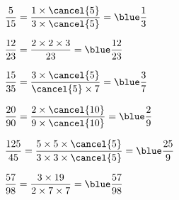    \ \\ [-5mm]
   \begin{colenumerate}{2}
      \item $\dfrac{5}{15} =\dfrac{1\times\cancel{5}}{3\times\cancel{5}} ={\blue \dfrac13}$ \medskip
      \item $\dfrac{12}{23} =\dfrac{2\times2\times3}{23} ={\blue \dfrac{12}{23}}$ \medskip
      \item $\dfrac{15}{35} =\dfrac{3\times\cancel{5}}{\cancel{5}\times7} ={\blue \dfrac37}$ \medskip
      \item $\dfrac{20}{90} =\dfrac{2\times\cancel{10}}{9\times\cancel{10}} ={\blue \dfrac29}$ \medskip
      \item $\dfrac{125}{45} =\dfrac{5\times5\times\cancel{5}}{3\times3\times\cancel{5}} ={\blue \dfrac{25}{9}}$ \medskip
      \item $\dfrac{57}{98} =\dfrac{3\times19}{2\times7\times7} ={\blue \dfrac{57}{98}}$
   \end{colenumerate}

